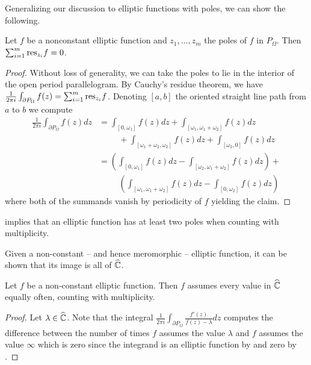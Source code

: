 Generalizing our discussion to elliptic functions with poles, we can show the following. 
\begin{proposition}\label{prop: residue sum is zero}
    Let $f$ be a nonconstant elliptic function and $z_{1},\dots,z_{m}$ the poles of $f$ in $P_{\Omega}$. Then $\sum_{i=1}^{m}\mathrm{res}_{z_{i}}f=0$. 
\end{proposition}
\begin{proof}
    Without loss of generality, we can take the poles to lie in the interior of the open period parallelogram. By Cauchy's residue theorem, we have $\frac{1}{2\pi i}\int_{\partial P_{\Omega}}f(z)=\sum_{i=1}^{m}\mathrm{res}_{z_{i}}f$. Denoting $[a,b]$ the oriented straight line path from $a$ to $b$ we compute
    \begin{align*}
        \frac{1}{2\pi i}\int_{\partial P_{\Omega}}f(z)dz &= \int_{[0,\omega_{1}]}f(z)dz + \int_{[\omega_{1},\omega_{1}+\omega_{2}]}f(z)dz\\
        &\hspace{1cm}+\int_{[\omega_{1}+\omega_{2},\omega_{2}]}f(z)dz + \int_{[\omega_{2},0]}f(z)dz \\
        &= \left(\int_{[0,\omega_{1}]}f(z)dz - \int_{[\omega_{2},\omega_{1}+\omega_{2}]}f(z)dz\right) + \\
        &\hspace{1cm} \left(\int_{[\omega_{1},\omega_{1}+\omega_{2}]}f(z)dz-\int_{[0,\omega_{2}]}f(z)dz\right)
    \end{align*}
    where both of the summands vanish by periodicity of $f$ yielding the claim. 
\end{proof}
\begin{remark}\label{rmk: at least two poles}
     implies that an elliptic function has at least two poles when counting with multiplicity. 
\end{remark}
Given a non-constant -- and hence meromorphic -- elliptic function, it can be shown that its image is all of $\widehat{\mathbb{C}}$. 
\begin{proposition}
    Let $f$ be a non-constant elliptic function. Then $f$ assumes every value in $\widehat{\mathbb{C}}$ equally often, counting with multiplicity. 
\end{proposition}
\begin{proof}
    Let $\lambda\in\widehat{\mathbb{C}}$. Note that the integral $\frac{1}{2\pi i}\int_{\partial P_{\Omega}}\frac{f'(z)}{f(z)-\lambda}dz$ computes the difference between the number of times $f$ assumes the value $\lambda$ and $f$ assumes the value $\infty$ which is zero since the integrand is an elliptic function by  and zero by . 
\end{proof}